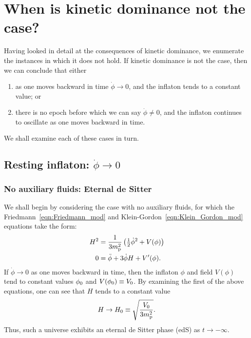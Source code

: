 \section{When is kinetic dominance not the case?}
\label{sec:When_is_kinetic_dominance_not_the_case?}
Having looked in detail at the consequences of kinetic dominance, we enumerate the instances in which it does not hold. If kinetic dominance is not the case, then we can conclude that either
%
\begin{enumerate}
    \item as one moves backward in time $\dot{\phi}\to 0$, and the inflaton tends to a constant value; or
    \item there is no epoch before which we can say $\dot{\phi}\ne 0$, and the inflaton continues to oscillate as one moves backward in time.
\end{enumerate}
%
We shall examine each of these cases in turn.

\subsection{Resting inflaton: $\dot{\phi}\to 0$}


\subsubsection{No auxiliary fluids: Eternal de Sitter}
We shall begin by considering the case with no auxiliary fluids, for which the Friedmann~\eqref{eqn:Friedmann_mod} and Klein-Gordon~\eqref{eqn:Klein_Gordon_mod} equations take the form:
%
\begin{align}
  H^2 
  &=
  \frac{1}{3m_{\mathrm{p}}^2}\left({\textstyle\frac{1}{2}}\dot{\phi}^2 + V(\phi) \right)
  \label{eqn:Friedmann_dotphi_to_zero_no_fluid} 
  \\
  0
  &=
  \ddot{\phi} +3\dot{\phi}H + V^\prime(\phi).
  \label{eqn:Klein_Gordon_dotphi_to_zero_no_fluid}
\end{align}
%
If $\dot{\phi}\to 0$ as one moves backward in time, then the inflaton $\phi$ and field $V(\phi)$ tend to constant values $\phi_0$ and $V(\phi_0)\equiv V_0$. By examining the first of the above equations, one can see that $H$ tends to a constant value 
%
\begin{equation}
  H\to H_0 \equiv \sqrt{\frac{V_0}{3m_{\mathrm{p}}^2}}.
\end{equation}
%
Thus, such a universe exhibits an eternal de Sitter phase (edS) as $t\to-\infty$.

